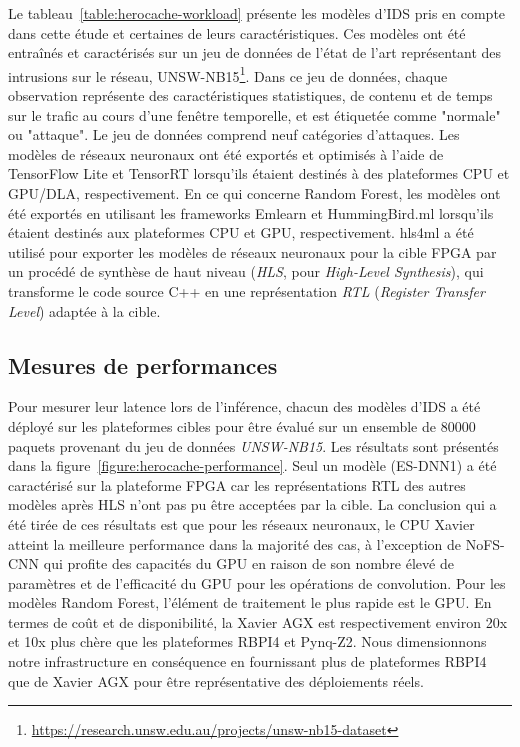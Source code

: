 Le tableau~\ref{table:herocache-workload} présente les modèles d'IDS pris en compte dans cette étude et certaines de leurs caractéristiques. Ces modèles ont été entraînés et caractérisés sur un jeu de données de l'état de l'art représentant des intrusions sur le réseau, UNSW-NB15\footnote{\href{https://research.unsw.edu.au/projects/unsw-nb15-dataset}{https://research.unsw.edu.au/projects/unsw-nb15-dataset}}. Dans ce jeu de données, chaque observation représente des caractéristiques statistiques, de contenu et de temps sur le trafic au cours d'une fenêtre temporelle, et est étiquetée comme "normale" ou "attaque". Le jeu de données comprend neuf catégories d'attaques. Les modèles de réseaux neuronaux ont été exportés et optimisés à l'aide de TensorFlow Lite et TensorRT lorsqu'ils étaient destinés à des plateformes CPU et GPU/DLA, respectivement. En ce qui concerne Random Forest, les modèles ont été exportés en utilisant les frameworks Emlearn et HummingBird.ml lorsqu'ils étaient destinés aux plateformes CPU et GPU, respectivement. hls4ml a été utilisé pour exporter les modèles de réseaux neuronaux pour la cible FPGA par un procédé de synthèse de haut niveau (\textit{HLS}, pour \textit{High-Level Synthesis}), qui transforme le code source C++ en une représentation \textit{RTL} (\textit{Register Transfer Level}) adaptée à la cible.

\subsection{Mesures de performances}

Pour mesurer leur latence lors de l'inférence, chacun des modèles d'IDS a été déployé sur les plateformes cibles pour être évalué sur un ensemble de $80 000$ paquets provenant du jeu de données \textit{UNSW-NB15}. Les résultats sont présentés dans la figure~\ref{figure:herocache-performance}. Seul un modèle (ES-DNN1) a été caractérisé sur la plateforme FPGA car les représentations RTL des autres modèles après HLS n'ont pas pu être acceptées par la cible. La conclusion qui a été tirée de ces résultats est que pour les réseaux neuronaux, le CPU Xavier atteint la meilleure performance dans la majorité des cas, à l'exception de NoFS-CNN qui profite des capacités du GPU en raison de son nombre élevé de paramètres et de l'efficacité du GPU pour les opérations de convolution. Pour les modèles Random Forest, l'élément de traitement le plus rapide est le GPU. En termes de coût et de disponibilité, la Xavier AGX est respectivement environ 20x et 10x plus chère que les plateformes RBPI4 et Pynq-Z2. Nous dimensionnons notre infrastructure en conséquence en fournissant plus de plateformes RBPI4 que de Xavier AGX pour être représentative des déploiements réels.

